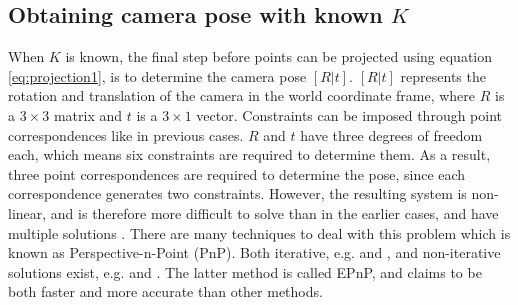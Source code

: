 \subsection{Obtaining camera pose with known $K$} \label{camera-pose}
When $K$ is known, the final step before points can be projected using equation \ref{eq:projection1}, is to determine the camera pose $[R|t]$. $[R|t]$ represents the rotation and translation of the camera in the world coordinate frame, where $R$ is a $3 \times 3$ matrix and $t$ is a $3 \times 1$ vector.
Constraints can be imposed through point correspondences like in previous cases.
$R$ and $t$ have three degrees of freedom each, which means six constraints are required to determine them.
As a result, three point correspondences are required to determine the pose, since each correspondence generates two constraints.
However, the resulting system is non-linear, and is therefore more difficult to solve than in the earlier cases, and have multiple solutions \cite[p. 187]{hartley-zisserman}. 
There are many techniques to deal with this problem which is known as Perspective-n-Point (PnP). 
Both iterative, e.g. \cite{hesch-pnp} and \cite{oberkampf-pnp}, and non-iterative solutions exist, e.g. \cite{quan-pnp} and \cite{lepetit-pnp}.
The latter method is called EPnP, and claims to be both faster and more accurate than other methods. 
















